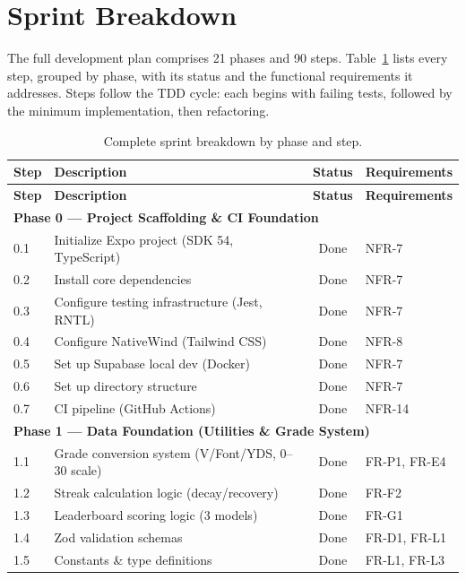 \documentclass[12pt,a4paper]{report}
\renewcommand\_{\textunderscore\hspace{0pt}}
\begin{document}
\section{Sprint Breakdown}

The full development plan comprises 21 phases and 90 steps. Table~\ref{tab:sprint-breakdown} lists every step, grouped by phase, with its status and the functional requirements it addresses. Steps follow the TDD cycle: each begins with failing tests, followed by the minimum implementation, then refactoring.

\renewcommand{\arraystretch}{1.1}
\small
\begin{longtable}{l >{\raggedright\arraybackslash}p{7.5cm} c >{\raggedright\arraybackslash}p{3cm}}
\caption{Complete sprint breakdown by phase and step.}\label{tab:sprint-breakdown}\\
\hline
\textbf{Step} & \textbf{Description} & \textbf{Status} & \textbf{Requirements} \\
\hline
\endfirsthead
\hline
\textbf{Step} & \textbf{Description} & \textbf{Status} & \textbf{Requirements} \\
\hline
\endhead

\multicolumn{4}{l}{\textbf{Phase 0 --- Project Scaffolding \& CI Foundation}} \\
\hline
0.1 & Initialize Expo project (SDK 54, TypeScript) & Done & NFR-7 \\
0.2 & Install core dependencies & Done & NFR-7 \\
0.3 & Configure testing infrastructure (Jest, RNTL) & Done & NFR-7 \\
0.4 & Configure NativeWind (Tailwind CSS) & Done & NFR-8 \\
0.5 & Set up Supabase local dev (Docker) & Done & NFR-7 \\
0.6 & Set up directory structure & Done & NFR-7 \\
0.7 & CI pipeline (GitHub Actions) & Done & NFR-14 \\

\hline
\multicolumn{4}{l}{\textbf{Phase 1 --- Data Foundation (Utilities \& Grade System)}} \\
\hline
1.1 & Grade conversion system (V/Font/YDS, 0--30 scale) & Done & FR-P1, FR-E4 \\
1.2 & Streak calculation logic (decay/recovery) & Done & FR-F2 \\
1.3 & Leaderboard scoring logic (3 models) & Done & FR-G1 \\
1.4 & Zod validation schemas & Done & FR-D1, FR-L1 \\
1.5 & Constants \& type definitions & Done & FR-L1, FR-L3 \\


\end{longtable}
\end{document}
